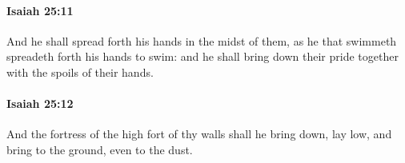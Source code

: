 		\paragraph{Isaiah 25:11} %
			\label{ISAIAH-25-11}

			And he shall spread forth his hands in the midst of them, as he that swimmeth spreadeth forth his hands to swim: and he shall bring down their pride together with the spoils of their hands.


		\paragraph{Isaiah 25:12} %
			\label{ISAIAH-25-12}

			And the fortress of the high fort of thy walls shall he bring down, lay low, and bring to the ground, even to the dust.

